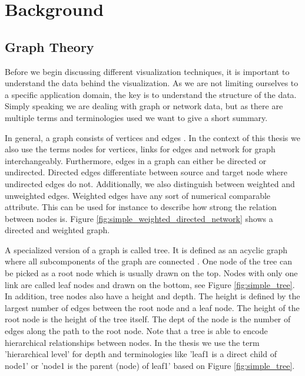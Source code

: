 \chapter{Background}

\section{Graph Theory}

Before we begin discussing different visualization techniques, it is important to understand the data behind the visualization. As we are not limiting ourselves to a specific application domain, the key is to understand the structure of the data. Simply speaking we are dealing with graph or network data, but as there are multiple terms and terminologies used we want to give a short summary. 

In general, a graph consists of vertices and edges \cite{diestel_graph_2017}. In the context of this thesis we also use the terms nodes for vertices, links for edges and network for graph interchangeably. Furthermore, edges in a graph can either be directed or undirected. Directed edges differentiate between source and target node where undirected edges do not. Additionally, we also distinguish between weighted and unweighted edges. Weighted edges have any sort of numerical comparable attribute. This can be used for instance to describe how strong the relation between nodes is. Figure \ref{fig:simple_weighted_directed_network} shows a directed and weighted graph.

A specialized version of a graph is called tree. It is defined as an acyclic graph where all subcomponents of the graph are connected \cite{diestel_graph_2017}. One node of the tree can be picked as a root node which is usually drawn on the top. Nodes with only one link are called leaf nodes and drawn on the bottom, see Figure \ref{fig:simple_tree}.\\
In addition, tree nodes also have a height and depth. The height is defined by the largest number of edges between the root node and a leaf node. The height of the root node is the height of the tree itself. The dept of the node is the number of edges along the path to the root node. Note that a tree is able to encode hierarchical relationships between nodes. In the thesis we use the term 'hierarchical level' for depth and terminologies like 'leaf1 is a direct child of node1' or 'node1 is the parent (node) of leaf1' based on Figure \ref{fig:simple_tree}.

